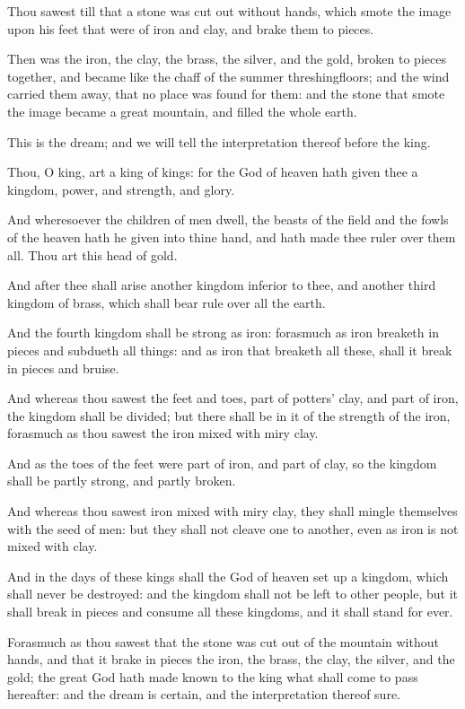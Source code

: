 \verse Thou sawest till that a stone was cut out without hands, which smote the image upon his feet that were of iron and clay, and brake them to pieces.

\verse Then was the iron, the clay, the brass, the silver, and the gold, broken to pieces together, and became like the chaff of the summer threshingfloors; and the wind carried them away, that no place was found for them: and the stone that smote the image became a great mountain, and filled the whole earth.

\verse This is the dream; and we will tell the interpretation thereof before the king.

\verse Thou, O king, art a king of kings: for the God of heaven hath given thee a kingdom, power, and strength, and glory.

\verse And wheresoever the children of men dwell, the beasts of the field and the fowls of the heaven hath he given into thine hand, and hath made thee ruler over them all. Thou art this head of gold.

\verse And after thee shall arise another kingdom inferior to thee, and another third kingdom of brass, which shall bear rule over all the earth.

\verse And the fourth kingdom shall be strong as iron: forasmuch as iron breaketh in pieces and subdueth all things: and as iron that breaketh all these, shall it break in pieces and bruise.

\verse And whereas thou sawest the feet and toes, part of potters' clay, and part of iron, the kingdom shall be divided; but there shall be in it of the strength of the iron, forasmuch as thou sawest the iron mixed with miry clay.

\verse And as the toes of the feet were part of iron, and part of clay, so the kingdom shall be partly strong, and partly broken.

\verse And whereas thou sawest iron mixed with miry clay, they shall mingle themselves with the seed of men: but they shall not cleave one to another, even as iron is not mixed with clay.

\verse And in the days of these kings shall the God of heaven set up a kingdom, which shall never be destroyed: and the kingdom shall not be left to other people, but it shall break in pieces and consume all these kingdoms, and it shall stand for ever.

\verse Forasmuch as thou sawest that the stone was cut out of the mountain without hands, and that it brake in pieces the iron, the brass, the clay, the silver, and the gold; the great God hath made known to the king what shall come to pass hereafter: and the dream is certain, and the interpretation thereof sure.

